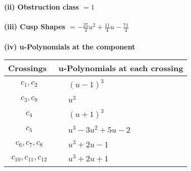 \documentclass[1p]{elsarticle_modified}
\theoremstyle{definition}
\begin{document}
\flushleft \textbf{(ii) Obstruction class $= 1$}\\~\\
\flushleft \textbf{(iii) Cusp Shapes $= -\frac{25}{4} u^2+\frac{11}{4} u-\frac{71}{4}$}\\~\\
\newpage\renewcommand{\arraystretch}{1}
\flushleft \textbf{(iv) u-Polynomials at the component}\newline \\
\begin{tabular}{m{50pt}|m{274pt}}
Crossings & \hspace{64pt}u-Polynomials at each crossing \\
\hline $$\begin{aligned}c_{1},c_{2}\end{aligned}$$&$\begin{aligned}
&(u-1)^3
\end{aligned}$\\
\hline $$\begin{aligned}c_{3},c_{9}\end{aligned}$$&$\begin{aligned}
&u^3
\end{aligned}$\\
\hline $$\begin{aligned}c_{4}\end{aligned}$$&$\begin{aligned}
&(u+1)^3
\end{aligned}$\\
\hline $$\begin{aligned}c_{5}\end{aligned}$$&$\begin{aligned}
&u^3-3 u^2+5 u-2
\end{aligned}$\\
\hline $$\begin{aligned}c_{6},c_{7},c_{8}\end{aligned}$$&$\begin{aligned}
&u^3+2 u-1
\end{aligned}$\\
\hline $$\begin{aligned}c_{10},c_{11},c_{12}\end{aligned}$$&$\begin{aligned}
&u^3+2 u+1
\end{aligned}$\\
\hline
\end{tabular}\\~\\
\end{document}
